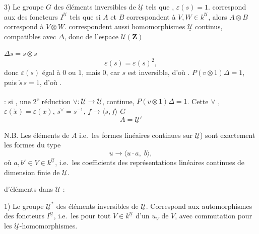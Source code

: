 \documentclass[11pt,a4paper]{article}
\begin{document}

3) Le groupe $G$ des éléments inversibles de $\underline{\mathcal{U}}$ tels que
, $\varepsilon(s) = 1$. \struck{\ill{}}
\ill{} correspond aux \ill{} des foncteurs $I^{\underline{\mathcal{U}}}$ tels
que si $A$ et $B$  correspondent à
$V, W \in k^{\underline{\mathcal{U}}}$, alors $A \otimes B$ correspond à
$V \otimes W$.  correspondent aussi \ill{} homomorphismes
 $\underline{\mathcal{U}}$ continus, compatibles avec $\Delta$,
donc \ill{} de l'espace $\underline{\mathcal{U}}(\mathbf{Z})$ \ill{}

\ill{} $\Delta s = s \otimes s$ \ill{}
\[ \varepsilon(s) = \varepsilon(s)^{2} , \]
donc $\varepsilon(s)$ égal à $0$ ou $1$, mais  $0$, car $s$ est
inversible, d'où
.
\ill{} $P(v \otimes 1)\Delta = 1$, puis $\check{s}\,s = 1$, d'où
.

\ill{}  : si \ill{}, une 2\textsuperscript{e} réduction
\ill{} $\vee : \underline{\mathcal{U}} \to \underline{\mathcal{U}}$, continue,
$P(v \otimes 1)\Delta = 1$. Cette $\vee$ \ill{},
$\varepsilon(\check{x}) = \varepsilon(x)$, \ill{} $s^{\vee} = s^{-1}$, \ill{}
$f \to \langle s, f \rangle$ \ill{} $G$ \ill{}
\[ A = \underline{\mathcal{U}}' \]
\ill{}



N.B. Les éléments de $A$ \struck{(} i.e.\ les formes linéaires continues sur
$\underline{\mathcal{U}}$) sont exactement les formes du type
\[ u \to \langle u \cdot a,\; b \rangle , \]
où $a, b' \in V \in k^{\underline{\mathcal{U}}}$, i.e.\ les coefficients des
représentations linéaires continues de dimension finie de
$\underline{\mathcal{U}}$. \struck{\ill{}}


\ill{} \ill{} d'éléments dans $\underline{\mathcal{U}}$ :

1) Le groupe $\underline{\mathcal{U}}^{*}$ \struck{\ill{}} des éléments
inversibles de $\underline{\mathcal{U}}$. Correspond aux \ill{} automorphismes
des foncteurs $I^{\underline{\mathcal{U}}}$, i.e.\ les \struck{\ill{}} \ill{}
pour tout $V \in k^{\underline{\mathcal{U}}}$ d'un  \ill{}
$u_{V}$ de $V$, avec commutation \ill{} pour les
$\underline{\mathcal{U}}$-homomorphismes. \uncertain{\ill{}}
\end{document}
